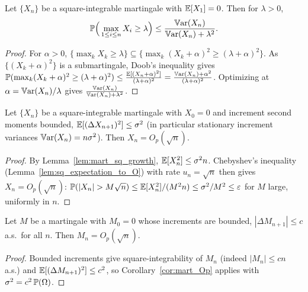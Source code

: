 \begin{lemma}\label{lem:chebyshev_mart}
Let $\{X_n\}$ be a square-integrable martingale with $\mathbb{E}[X_1] = 0$. Then for
$\lambda > 0$,
\[
  \mathbb{P}\Big(\max_{1\le i\le n} X_i \ge \lambda\Big)
  \le \frac{\mathbb{V}\mathrm{ar}(X_n)}{\mathbb{V}\mathrm{ar}(X_n) + \lambda^2}.
\]
\end{lemma}

\begin{proof}
For $\alpha > 0$, $\{\max_k X_k \ge \lambda\} \subseteq
\{\max_k (X_k+\alpha)^2 \ge (\lambda+\alpha)^2\}$. As $\{(X_k+\alpha)^2\}$ is a
submartingale, Doob's inequality gives
$\mathbb{P}(\max_k(X_k+\alpha)^2 \ge (\lambda+\alpha)^2)
 \le \frac{\mathbb{E}[(X_n+\alpha)^2]}{(\lambda+\alpha)^2}
 = \frac{\mathbb{V}\mathrm{ar}(X_n)+\alpha^2}{(\lambda+\alpha)^2}$.
Optimizing at $\alpha = \mathbb{V}\mathrm{ar}(X_n)/\lambda$ gives
$\frac{\mathbb{V}\mathrm{ar}(X_n)}{\mathbb{V}\mathrm{ar}(X_n)+\lambda^2}$.
\end{proof}

\begin{corollary}\label{cor:mart_Op}
\leanok
{}
Let $\{X_n\}$ be a square-integrable martingale with $X_0 = 0$ and increment
second moments bounded, $\mathbb{E}[(\Delta X_{n+1})^2] \le \sigma^2$ (in particular
stationary increment variances $\mathbb{V}\mathrm{ar}(X_n) = n\sigma^2$). Then $X_n = O_p(\sqrt n)$.
\end{corollary}

\begin{proof}\leanok
{}
By Lemma~\ref{lem:mart_sq_growth}, $\mathbb{E}[X_n^2] \le \sigma^2 n$. Chebyshev's
inequality (Lemma~\ref{lem:sq_expectation_to_O}) with rate $u_n = \sqrt n$ then
gives $X_n = O_p(\sqrt n)$: $\mathbb{P}(|X_n| > M\sqrt n) \le \mathbb{E}[X_n^2]/(M^2 n)
\le \sigma^2/M^2 \le \varepsilon$ for $M$ large, uniformly in $n$.
\end{proof}

\begin{lemma}\label{lem:mart_bdd_incr_Op}
\leanok
{}
Let $M$ be a martingale with $M_0 = 0$ whose increments are bounded,
$|\Delta M_{n+1}| \le c$ a.s.\ for all $n$. Then $M_n = O_p(\sqrt n)$.
\end{lemma}

\begin{proof}\leanok
{}
Bounded increments give square-integrability of $M_n$ (indeed $|M_n| \le cn$ a.s.)
and $\mathbb{E}[(\Delta M_{n+1})^2] \le c^2$, so Corollary~\ref{cor:mart_Op} applies with
$\sigma^2 = c^2\,\mathbb{P}(\Omega)$.
\end{proof}

